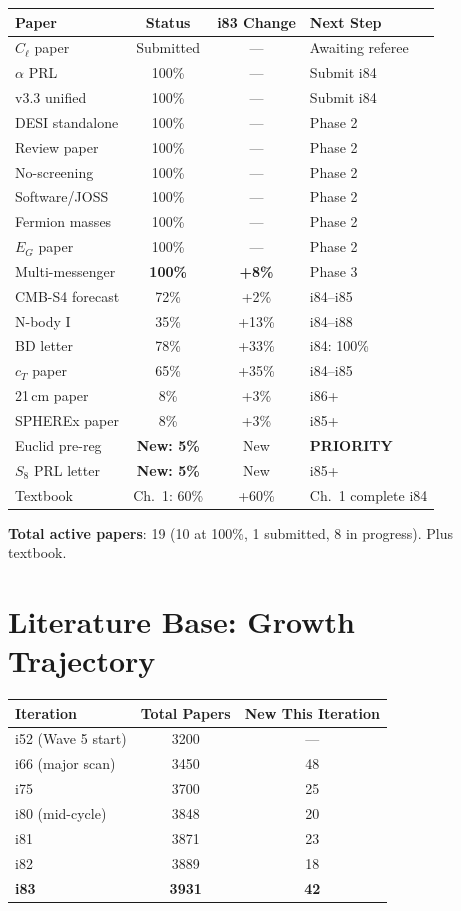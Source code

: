 \documentclass[11pt,a4paper]{article}
\begin{document}
\begin{center}
\begin{tabular}{lccl}
\toprule
\textbf{Paper} & \textbf{Status} & \textbf{i83 Change} & \textbf{Next Step} \\
\midrule
$C_\ell$ paper & Submitted & --- & Awaiting referee \\
$\alpha$ PRL & 100\% & --- & Submit i84 \\
v3.3 unified & 100\% & --- & Submit i84 \\
DESI standalone & 100\% & --- & Phase 2 \\
Review paper & 100\% & --- & Phase 2 \\
No-screening & 100\% & --- & Phase 2 \\
Software/JOSS & 100\% & --- & Phase 2 \\
Fermion masses & 100\% & --- & Phase 2 \\
$E_G$ paper & 100\% & --- & Phase 2 \\
Multi-messenger & \textbf{100\%} & \textbf{+8\%} & Phase 3 \\
CMB-S4 forecast & 72\% & +2\% & i84--i85 \\
N-body I & 35\% & +13\% & i84--i88 \\
BD letter & 78\% & +33\% & i84: 100\% \\
$c_T$ paper & 65\% & +35\% & i84--i85 \\
21\,cm paper & 8\% & +3\% & i86+ \\
SPHEREx paper & 8\% & +3\% & i85+ \\
Euclid pre-reg & \textbf{New: 5\%} & New & \textbf{PRIORITY} \\
$S_8$ PRL letter & \textbf{New: 5\%} & New & i85+ \\
Textbook & Ch.\ 1: 60\% & +60\% & Ch.\ 1 complete i84 \\
\bottomrule
\end{tabular}
\end{center}

\textbf{Total active papers}: 19 (10 at 100\%, 1 submitted, 8 in progress). Plus textbook.

\section{Literature Base: Growth Trajectory}

\begin{center}
\begin{tabular}{lcc}
\toprule
\textbf{Iteration} & \textbf{Total Papers} & \textbf{New This Iteration} \\
\midrule
i52 (Wave 5 start) & 3200 & --- \\
i66 (major scan) & 3450 & 48 \\
i75 & 3700 & 25 \\
i80 (mid-cycle) & 3848 & 20 \\
i81 & 3871 & 23 \\
i82 & 3889 & 18 \\
\textbf{i83} & \textbf{3931} & \textbf{42} \\
\bottomrule
\end{tabular}
\end{center}
\end{document}
